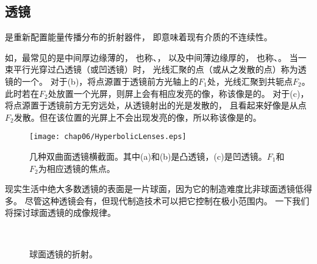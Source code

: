 \subsection{透镜}\label{sub:透镜}
\begin{definition}
    是重新配置能量传播分布的折射器件，
    即意味着现有介质的不连续性。
\end{definition}

如，最常见的是中间厚边缘薄的，
也称、，
以及中间薄边缘厚的，
也称、。
当一束平行光穿过凸透镜（或凹透镜）时，
光线汇聚的点（或从之发散的点）称为透镜的一个。
对于(b)，将点源置于透镜前方光轴上的$F_1$处，光线汇聚到共轭点$F_2$。
此时若在$F_2$处放置一个光屏，则屏上会有相应发亮的像，称该像是的。
对于(c)，将点源置于透镜前方无穷远处，从透镜射出的光是发散的，
且看起来好像是从点$F_2$发散。但在该位置的光屏上不会出现发亮的像，所以称该像是的。
\begin{figure}[htbp]
    \centering\texttt{[image: chap06/HyperbolicLenses.eps]}
    \caption{几种双曲面透镜横截面。其中(a)和(b)是凸透镜，(c)是凹透镜。$F_1$和$F_2$为相应透镜的焦点。}
    \label{fig:6.30}
\end{figure}

现实生活中绝大多数透镜的表面是一片球面，因为它的制造难度比非球面透镜低得多。
尽管这种透镜会有，但现代制造技术可以把它控制在极小范围内。
一下我们将探讨球面透镜的成像规律。
\begin{figure}[htbp]
    \centering
    \,
    \caption{球面透镜的折射。}
    \label{fig:6.31}
\end{figure}
